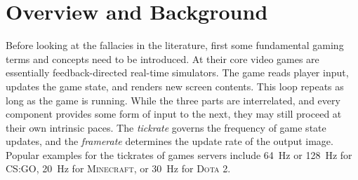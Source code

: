\section{Overview and Background}
\label{sec:background}

Before looking at the fallacies in the literature, first some fundamental gaming terms and concepts need to be introduced. At their core video games are essentially feedback-directed real-time simulators. The game reads player input, updates the game state, and renders new screen contents. This loop repeats as long as the game is running. While the three parts are interrelated, and every component provides some form of input to the next, they may still proceed at their own intrinsic paces. The \textit{tickrate} governs the frequency of game state updates, and the \textit{framerate} determines the update rate of the output image. Popular examples for the tickrates of games servers include \SI{64}{\hertz} or \SI{128}{\hertz} for \textsc{CS:GO}, \SI{20}{\hertz} for \textsc{Minecraft}, or \SI{30}{\hertz} for \textsc{Dota 2}.




